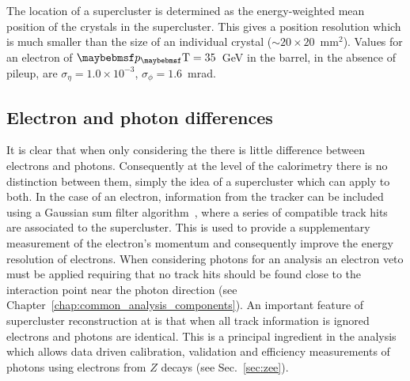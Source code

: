 The location of a supercluster is determined as the energy-weighted mean position of the crystals in the supercluster. This gives a position resolution which is much smaller than the size of an individual crystal ($\sim20\times20$~mm$^{2}$). Values for an electron of $\pT=35$~GeV in the \ECAL barrel, in the absence of pileup, are $\sigma_{\eta}=1.0\times10^{-3}$, $\sigma_{\phi}=1.6$~mrad.

\subsection{Electron and photon differences}

It is clear that when only considering the \ECAL there is little difference between electrons and photons. Consequently at the level of the calorimetry there is no distinction between them, simply the idea of a supercluster which can apply to both. In the case of an electron, information from the tracker can be included using a Gaussian sum filter algorithm~\cite{tracker_electron_reco}, where a series of compatible track hits are associated to the supercluster. This is used to provide a supplementary measurement of the electron's momentum and consequently improve the energy resolution of electrons. When considering photons for an analysis an electron veto must be applied requiring that no track hits should be found close to the interaction point near the photon direction (see Chapter~\ref{chap:common_analysis_components}). An important feature of supercluster reconstruction at \CMS is that when all track information is ignored electrons and photons are identical. This is a principal ingredient in the \Hgg analysis which allows data driven calibration, validation and efficiency measurements of photons using electrons from $Z$ decays (see Sec.~\ref{sec:zee}).

